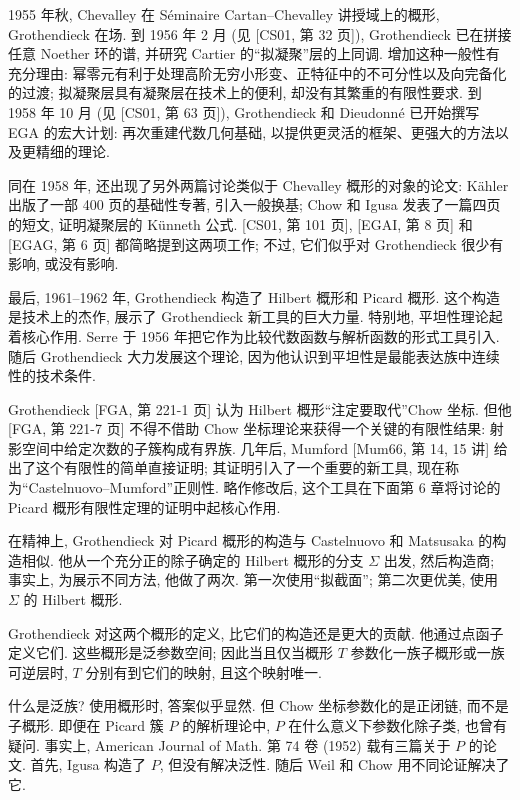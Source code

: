 1955 年秋, Chevalley 在 Séminaire Cartan--Chevalley 讲授域上的概形, Grothendieck 在场. 到 1956 年 2 月 (见 [CS01, 第 32 页]), Grothendieck 已在拼接任意 Noether 环的谱, 并研究 Cartier 的“拟凝聚”层的上同调. 增加这种一般性有充分理由: 幂零元有利于处理高阶无穷小形变、正特征中的不可分性以及向完备化的过渡; 拟凝聚层具有凝聚层在技术上的便利, 却没有其繁重的有限性要求. 到 1958 年 10 月 (见 [CS01, 第 63 页]), Grothendieck 和 Dieudonné 已开始撰写 EGA 的宏大计划: 再次重建代数几何基础, 以提供更灵活的框架、更强大的方法以及更精细的理论.

同在 1958 年, 还出现了另外两篇讨论类似于 Chevalley 概形的对象的论文: Kähler 出版了一部 400 页的基础性专著, 引入一般换基; Chow 和 Igusa 发表了一篇四页的短文, 证明凝聚层的 Künneth 公式. [CS01, 第 101 页], [EGAI, 第 8 页] 和 [EGAG, 第 6 页] 都简略提到这两项工作; 不过, 它们似乎对 Grothendieck 很少有影响, 或没有影响.

最后, 1961--1962 年, Grothendieck 构造了 Hilbert 概形和 Picard 概形. 这个构造是技术上的杰作, 展示了 Grothendieck 新工具的巨大力量. 特别地, 平坦性理论起着核心作用. Serre 于 1956 年把它作为比较代数函数与解析函数的形式工具引入. 随后 Grothendieck 大力发展这个理论, 因为他认识到平坦性是最能表达族中连续性的技术条件.

Grothendieck [FGA, 第 221-1 页] 认为 Hilbert 概形“注定要取代”Chow 坐标. 但他 [FGA, 第 221-7 页] 不得不借助 Chow 坐标理论来获得一个关键的有限性结果: 射影空间中给定次数的子簇构成有界族. 几年后, Mumford [Mum66, 第 14, 15 讲] 给出了这个有限性的简单直接证明; 其证明引入了一个重要的新工具, 现在称为“Castelnuovo--Mumford”正则性. 略作修改后, 这个工具在下面第 6 章将讨论的 Picard 概形有限性定理的证明中起核心作用.

在精神上, Grothendieck 对 Picard 概形的构造与 Castelnuovo 和 Matsusaka 的构造相似. 他从一个充分正的除子确定的 Hilbert 概形的分支 $\Sigma$ 出发, 然后构造商; 事实上, 为展示不同方法, 他做了两次. 第一次使用“拟截面”; 第二次更优美, 使用 $\Sigma$ 的 Hilbert 概形.

Grothendieck 对这两个概形的定义, 比它们的构造还是更大的贡献. 他通过点函子定义它们. 这些概形是泛参数空间; 因此当且仅当概形 $T$ 参数化一族子概形或一族可逆层时, $T$ 分别有到它们的映射, 且这个映射唯一.

什么是泛族? 使用概形时, 答案似乎显然. 但 Chow 坐标参数化的是正闭链, 而不是子概形. 即便在 Picard 簇 $P$ 的解析理论中, $P$ 在什么意义下参数化除子类, 也曾有疑问. 事实上, American Journal of Math. 第 74 卷 (1952) 载有三篇关于 $P$ 的论文. 首先, Igusa 构造了 $P$, 但没有解决泛性. 随后 Weil 和 Chow 用不同论证解决了它.

